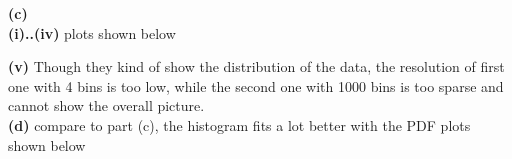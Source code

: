 \documentclass[11pt]{article}
\begin{document}
\noindent\textbf{(c)} \\

\textbf{(i)..(iv)} plots shown below

\begin{figure}[h]
\centering
{}
\end{figure}

\textbf{(v)}
Though they kind of show the distribution of the data, the resolution of first one with 4 bins is too low, while the second one with 1000 bins is too sparse and cannot show the overall picture.\\

\noindent\textbf{(d)}
compare to part (c), the histogram fits a lot better with the PDF
plots shown below

\begin{figure}[h]
\centering
{}
\end{figure}
\pagebreak
\end{document}
